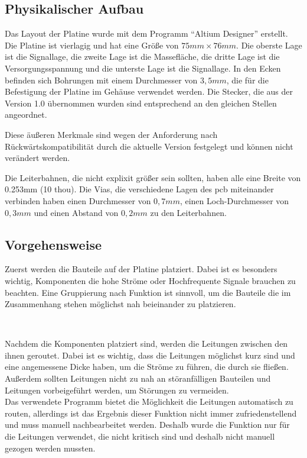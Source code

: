 \subsection{Physikalischer Aufbau}
Das Layout der Platine wurde mit dem Programm \enquote{Altium Designer} erstellt. Die Platine ist vierlagig und hat eine Größe
von \(75mm \times 76mm\). Die oberste Lage ist die Signallage, die zweite Lage ist die Massefläche, die dritte Lage ist die
Versorgungsspannung und die unterste Lage ist die Signallage. In den Ecken befinden sich Bohrungen mit einem Durchmesser von
\(3,5mm\), die für die Befestigung der Platine im Gehäuse verwendet werden. Die Stecker, die aus der Version 1.0 übernommen 
wurden sind entsprechend an den gleichen Stellen angeordnet. 

Diese äußeren Merkmale sind wegen der Anforderung nach Rückwärtskompatibilität durch die aktuelle Version festgelegt und können 
nicht verändert werden.

Die Leiterbahnen, die nicht explixit größer sein sollten, haben alle eine Breite von 0.253mm (10 thou). Die Vias, die verschiedene 
Lagen des \ac{pcb} miteinander verbinden haben einen Durchmesser von \(0,7mm\), einen Loch-Durchmesser von \(0,3mm\) und einen 
Abstand von \(0,2mm\) zu den Leiterbahnen.

\subsection{Vorgehensweise}
Zuerst werden die Bauteile auf der Platine platziert. Dabei ist es besonders
wichtig, Komponenten die hohe Ströme oder Hochfrequente Signale brauchen zu beachten. Eine Gruppierung nach Funktion ist sinnvoll, 
um die Bauteile die im Zusammenhang stehen möglichst nah beieinander zu platzieren.

\

Nachdem die Komponenten platziert sind, werden die Leitungen zwischen den ihnen geroutet. Dabei ist es wichtig, dass die Leitungen
möglichst kurz sind und eine angemessene Dicke haben, um die Ströme zu führen, die durch sie fließen. Außerdem sollten Leitungen 
nicht zu nah an störanfälligen Bauteilen und Leitungen vorbeigeführt werden, um Störungen zu vermeiden. \\
Das verwendete Programm bietet die Möglichkeit die Leitungen automatisch zu routen, allerdings ist das Ergebnis dieser Funktion
nicht immer zufriedenstellend und muss manuell nachbearbeitet werden. Deshalb wurde die Funktion nur für die Leitungen verwendet,
die nicht kritisch sind und deshalb nicht manuell gezogen werden mussten.

